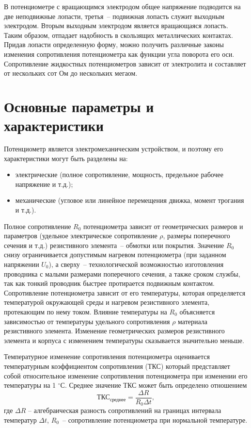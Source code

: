 В потенциометре с вращающимся электродом общее напряжение подводится на две неподвижные лопасти, третья~-- подвижная лопасть служит выходным электродом. Вторым выходным электродом является вращающаяся лопасть. Таким образом, отпадает надобность в скользящих металлических контактах. Придав лопасти определенную форму, можно получить различные законы изменения сопротивления потенциометра как функции угла поворота его оси. Сопротивление жидкостных потенциометров зависит от электролита и составляет от нескольких сот Ом до нескольких мегаом.

\section{Основные параметры и характеристики}

Потенциометр является электромеханическим устройством, и поэтому его характеристики могут быть разделены на:
\begin{itemize}
\item электрические (полное сопротивление, мощность, предельное рабочее напряжение и т.д.);
\item механические (угловое или линейное перемещения движка, момент трогания и т.д.).
\end{itemize}

Полное сопротивление $ R_0 $ потенциометра зависит от геометрических размеров и параметров (удельное электрическое сопротивление $ \rho $, размеры поперечного сечения и т.д.) резистивного элемента~-- обмотки или покрытия. Значение $ R_0 $ снизу ограничивается допустимым нагревом потенциометра (при заданном напряжении $ U_0 $), а сверху~-- технологической возможностью изготовления проводника с малыми размерами поперечного сечения, а также сроком службы, так как тонкий проводник быстрее протирается подвижным контактом. Сопротивление потенциометра зависит от его температуры, которая определяется температурой окружающей среды и нагревом резистивного элемента, протекающим по нему током. Влияние температуры на $ R_0 $ объясняется зависимостью от температуры удельного сопротивления $ \rho $ материала резистивного элемента. Изменение геометрических размеров резистивного элемента и корпуса с изменением температуры сказывается значительно меньше.

Температурное изменение сопротивления потенциометра оценивается температурным коэффициентом сопротивления (ТКС) который представляет собой относительное изменение сопротивления потенциометра при изменении его температуры на 1 $ ^\circ $С. Среднее значение ТКС может быть определено отношением
\[\text{ТКС}_\text{среднее} = \dfrac{\Delta R}{R_0 \Delta t},\]
где $ \Delta R $ -- алгебраическая разность сопротивлений на границах интервала температур $ \Delta t $, $ R_0 $~-- сопротивление потенциометра при нормальной температуре.

